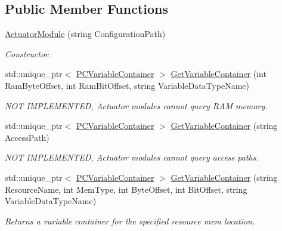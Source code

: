 \subsection*{Public Member Functions}
\begin{DoxyCompactItemize}
\item 
\hyperlink{classpc__emulator_1_1ActuatorModule_ab3d1a4dee9fe031b83ae6320327dc931}{Actuator\+Module} (string Configuration\+Path)\hypertarget{classpc__emulator_1_1ActuatorModule_ab3d1a4dee9fe031b83ae6320327dc931}{}\label{classpc__emulator_1_1ActuatorModule_ab3d1a4dee9fe031b83ae6320327dc931}

\begin{DoxyCompactList}\small\item\em Constructor. \end{DoxyCompactList}\item 
std\+::unique\+\_\+ptr$<$ \hyperlink{classpc__emulator_1_1PCVariableContainer}{P\+C\+Variable\+Container} $>$ \hyperlink{classpc__emulator_1_1ActuatorModule_a0708323c05eec00925ad87fe95139ce4}{Get\+Variable\+Container} (int Ram\+Byte\+Offset, int Ram\+Bit\+Offset, string Variable\+Data\+Type\+Name)
\begin{DoxyCompactList}\small\item\em N\+OT I\+M\+P\+L\+E\+M\+E\+N\+T\+ED, Actuator modules cannot query R\+AM memory. \end{DoxyCompactList}\item 
std\+::unique\+\_\+ptr$<$ \hyperlink{classpc__emulator_1_1PCVariableContainer}{P\+C\+Variable\+Container} $>$ \hyperlink{classpc__emulator_1_1ActuatorModule_a3d7f86c890cfd8301bd8481f235457d4}{Get\+Variable\+Container} (string Access\+Path)
\begin{DoxyCompactList}\small\item\em N\+OT I\+M\+P\+L\+E\+M\+E\+N\+T\+ED, Actuator modules cannot query access paths. \end{DoxyCompactList}\item 
std\+::unique\+\_\+ptr$<$ \hyperlink{classpc__emulator_1_1PCVariableContainer}{P\+C\+Variable\+Container} $>$ \hyperlink{classpc__emulator_1_1ActuatorModule_a9a11319d8be1d35f290c3172fe3f5465}{Get\+Variable\+Container} (string Resource\+Name, int Mem\+Type, int Byte\+Offset, int Bit\+Offset, string Variable\+Data\+Type\+Name)
\begin{DoxyCompactList}\small\item\em Returns a variable container for the specified resource mem location. \end{DoxyCompactList}\end{DoxyCompactItemize}
